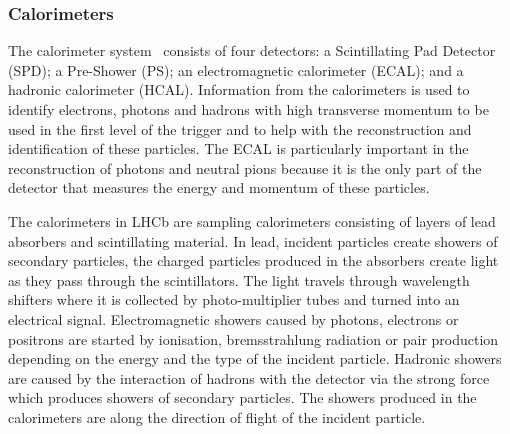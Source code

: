 

\subsubsection{Calorimeters}
\label{Calo}

The calorimeter system~\cite{LHCB:2000ab} consists of four detectors: a Scintillating Pad Detector (SPD); a Pre-Shower (PS); an electromagnetic calorimeter (ECAL); and a hadronic calorimeter (HCAL). Information from the calorimeters is used to identify electrons, photons and hadrons with high transverse momentum to be used in the first level of the trigger and to help with the reconstruction and identification of these particles. The ECAL is particularly important in the reconstruction of photons and neutral pions because it is the only part of the detector that measures the energy and momentum of these particles. 

The calorimeters in LHCb are sampling calorimeters consisting of layers of lead absorbers and scintillating material. In lead, incident particles create showers of secondary particles, the charged particles produced in the absorbers create light as they pass through the scintillators. The light travels through wavelength shifters where it is collected by photo-multiplier tubes and turned into an electrical signal. Electromagnetic showers caused by photons, electrons or positrons are started by ionisation, bremsstrahlung radiation or pair production depending on the energy and the type of the incident particle. Hadronic showers are caused by the interaction of hadrons with the detector via the strong force which produces showers of secondary particles. The showers produced in the calorimeters are along the direction of flight of the incident particle. %

